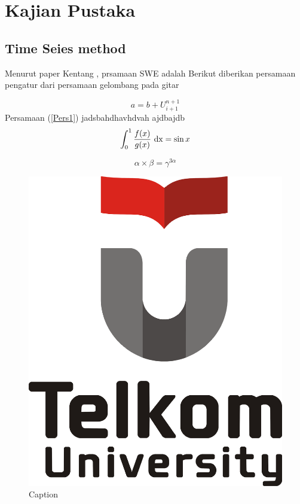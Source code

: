 \chapter{Kajian Pustaka}

\section{Time Seies method}
Menurut paper Kentang \cite{Kentang}, prsamaan SWE adalah
Berikut diberikan persamaan pengatur dari persamaan gelombang pada gitar

\begin{equation}\label{Pers1}
    a=b+U^{n+1}_{i+1}
\end{equation}
Persamaan (\ref{Pers1}) jadsbahdhavhdvah ajdbajdb
\begin{equation}\label{nama-rumus}
    \int_0^1 \frac{f(x)}{g(x)}\ {\rm dx}=\sin x
\end{equation}

\begin{equation}\label{nama-rumus1}
   \alpha \times \beta =\gamma^{3\alpha}
\end{equation}

\begin{figure}[h!]
    \centering
    \includegraphics[scale=0.1]{Tel-U-Logo.png}
    \caption{Caption}
    \label{fig:my_label1}
\end{figure} 

